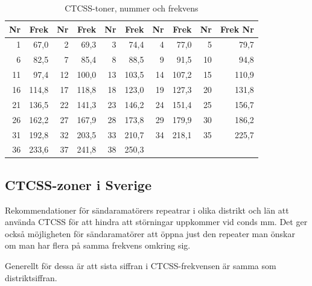 \begin{table}[H]
\centering
\begin{tabular}{rr|rr|rr|rr|rr}
\textbf{Nr} & \textbf{Frek} & \textbf{Nr} & \textbf{Frek} &\textbf{Nr} & \textbf{Frek} &\textbf{Nr} & \textbf{Frek} &\textbf{Nr} & \textbf{Frek} \textbf{Nr} \\ \hline
	 1 &  67,0 &  2 &  69,3 &  3 &  74,4 &  4 &  77,0 &  5 &  79,7 \\ \hline
	 6 &  82,5 &  7 &  85,4 &  8 &  88,5 &  9 &  91,5 & 10 &  94,8 \\ \hline
	11 &  97,4 & 12 & 100,0 & 13 & 103,5 & 14 & 107,2 & 15 & 110,9 \\ \hline
	16 & 114,8 & 17 & 118,8 & 18 & 123,0 & 19 & 127,3 & 20 & 131,8 \\ \hline
	21 & 136,5 & 22 & 141,3 & 23 & 146,2 & 24 & 151,4 & 25 & 156,7 \\ \hline
	26 & 162,2 & 27 & 167,9 & 28 & 173,8 & 29 & 179,9 & 30 & 186,2 \\ \hline
	31 & 192,8 & 32 & 203,5 & 33 & 210,7 & 34 & 218,1 & 35 & 225,7 \\ \hline
	36 & 233,6 & 37 & 241,8 & 38 & 250,3 &    &       &    &
\end{tabular}
\caption{CTCSS-toner, nummer och frekvens}
\end{table}

\subsection{CTCSS-zoner i Sverige}

Rekommendationer för sändaramatörers repeatrar i olika distrikt och län att
använda CTCSS för att hindra att störningar uppkommer vid conds mm. Det ger
också möjligheten för sändaramatörer att öppna just den repeater man önskar om
man har flera på samma frekvens omkring sig.

Generellt för dessa är att sista siffran i CTCSS-frekvensen är samma som
distriktsiffran.

